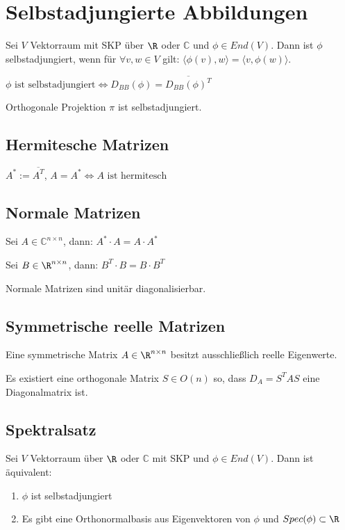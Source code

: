 \section*{Selbstadjungierte Abbildungen}

Sei $V$ Vektorraum mit SKP über $\R$ oder $\mathbb{C}$ und $\phi \in End(V)$. Dann ist $\phi$ selbstadjungiert, wenn für $\forall v, w \in V$ gilt: $\langle \phi(v), w \rangle = \langle v, \phi(w) \rangle$.

$\phi \text{ ist selbstadjungiert} \Leftrightarrow D_{BB}(\phi)=\overline{D_{BB}(\phi)^T}$

Orthogonale Projektion $\pi$ ist selbstadjungiert.

\subsection*{Hermitesche Matrizen}

$A^* := \overline{A^T}$, $A = A^* \Leftrightarrow A \text{ ist hermitesch}$

\subsection*{Normale Matrizen}

Sei $A \in \mathbb{C}^{n\times n}$, dann: $A^* \cdot A = A \cdot A^*$

Sei $B \in \R^{n\times n}$, dann: $B^T \cdot B = B \cdot B^T$

Normale Matrizen sind unitär diagonalisierbar.

\subsection*{Symmetrische reelle Matrizen}

Eine symmetrische Matrix $A \in \R^{n\times n}$ besitzt ausschließlich reelle Eigenwerte.

Es existiert eine orthogonale Matrix $S \in O(n)$ so, dass $D_A = S^TAS$ eine Diagonalmatrix ist.

\subsection*{Spektralsatz}

Sei $V$ Vektorraum über $\R$ oder $\mathbb{C}$ mit SKP und $\phi \in End(V)$. Dann ist äquivalent:

\begin{enumerate}[label=(\alph*)]
	\item $\phi$ ist selbstadjungiert
	\item Es gibt eine Orthonormalbasis aus Eigenvektoren von $\phi$ und $Spec(\phi) \subset \R$
\end{enumerate}


